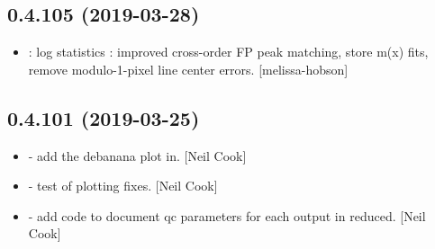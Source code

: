 \documentclass[a4paper,10pt,english]{report}
\begin{document}
\subsection{0.4.105 (2019-03-28)}
\label{\detokenize{misc/changelog:id158}}\begin{itemize}
\item {} 
: log statistics : improved cross-order FP
peak matching, store m(x) fits, remove modulo-1-pixel line center
errors. {[}melissa-hobson{]}

\end{itemize}


\subsection{0.4.101 (2019-03-25)}
\label{\detokenize{misc/changelog:id159}}\begin{itemize}
\item {} 
 - add the debanana plot in. {[}Neil Cook{]}

\item {} 
 - test of plotting fixes. {[}Neil Cook{]}

\item {} 
 - add code to document qc parameters for each output in
reduced. {[}Neil Cook{]}

\end{itemize}
\end{document}
